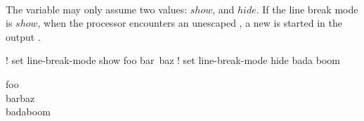  \\

The  variable may only assume two values: \inline$show$, and \inline$hide$. If the line break mode is \inline$show$, when the processor encounters an unescaped , a new  is started in the output . \\

\begin{examples}
\begin{examplesource}
! set line-break-mode show
foo
bar\
baz
! set line-break-mode hide
bada
boom
\end{examplesource}
  \begin{exampleoutput}
    foo\\
    barbaz\\
    badaboom
  \end{exampleoutput}
\end{examples}

